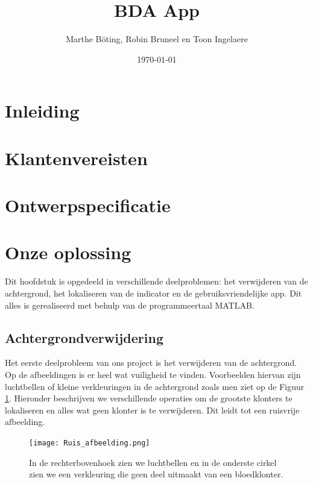 \documentclass[a4paper,kulak]{kulakarticle}
\date{\today}
\title{BDA App}
\author{Marthe B\"{o}ting, Robin Bruneel en Toon Ingelaere}
\begin{document}
	
	
	\maketitle
	\section*{Inleiding}
		

\tableofcontents

\section{Klantenvereisten}


\section{Ontwerpspecificatie}


\section{Onze oplossing}
Dit hoofdstuk is opgedeeld in verschillende deelproblemen: het verwijderen van de achtergrond, het lokaliseren van de indicator en de gebruiksvriendelijke app. Dit alles is gerealiseerd met behulp van de programmeertaal MATLAB.

\subsection{Achtergrondverwijdering}
Het eerste deelprobleem van ons project is het verwijderen van de achtergrond. Op de afbeeldingen is er heel wat vuiligheid te vinden. Voorbeelden hiervan zijn luchtbellen of kleine verkleuringen in de achtergrond zoals men ziet op de Figuur \ref{figuur achtergrondverwijdering}. Hieronder beschrijven we verschillende operaties om de grootste klonters te lokaliseren en alles wat geen klonter is te verwijderen. Dit leidt tot een ruisvrije afbeelding.

\begin{figure}[H]
	\centering
	\texttt{[image: Ruis\_afbeelding.png]}	
	\caption{In de rechterbovenhoek zien we luchtbellen en in de onderste cirkel zien we een verkleuring die geen deel uitmaakt van een bloedklonter.}
	\label{figuur achtergrondverwijdering}
\end{figure}
\end{document}
